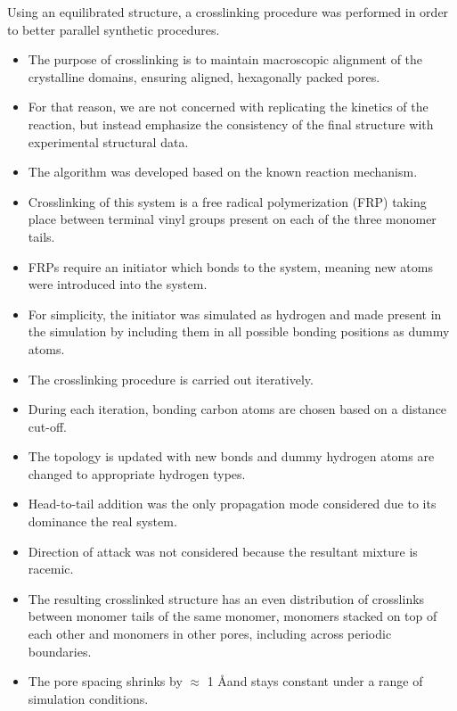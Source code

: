 \documentclass{article}
\newcommand{\angstrom}{\textup{\AA}}
\begin{document}
  Using an equilibrated structure, a crosslinking procedure was performed
  in order to better parallel synthetic procedures. 
  \begin{itemize}
    \item The purpose of crosslinking is to maintain macroscopic alignment of 
    the crystalline domains, ensuring aligned, hexagonally packed pores.
    \item For that reason, we are not concerned with replicating the kinetics 
    of the reaction, but instead emphasize the consistency of the final structure
    with experimental structural data.
    \item The algorithm was developed based on the known reaction mechanism.
    \item Crosslinking of this system is a free radical polymerization (FRP)
    taking place between terminal vinyl groups present on each of the three
    monomer tails.
    \item FRPs require an initiator which bonds to the system, meaning new atoms
    were introduced into the system.
    \item For simplicity, the initiator was simulated as hydrogen and made present 
    in the simulation by including them in all possible bonding positions as dummy atoms.
    \item The crosslinking procedure is carried out iteratively.
    \item During each iteration, bonding carbon atoms are chosen based on a distance cut-off.
    \item The topology is updated with new bonds and dummy hydrogen atoms are 
    changed to appropriate hydrogen types. 
    \item Head-to-tail addition was the only propagation mode considered due to 
    its dominance the real system.
    \item Direction of attack was not considered because the resultant mixture 
    is racemic.
    \item The resulting crosslinked structure has an even distribution of
    crosslinks between monomer tails of the same monomer, monomers stacked on
    top of each other and monomers in other pores, including across periodic
    boundaries.
    \item The pore spacing shrinks by $\approx$ 1 \angstrom and stays 
    constant under a range of simulation conditions.
  \end{itemize}
  
\end{document}
